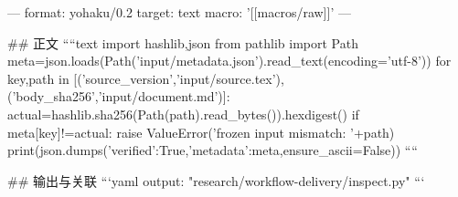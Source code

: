 ---
format: yohaku/0.2
target: text
macro: '[[macros/raw]]'
---

## 正文
````text
import hashlib,json
from pathlib import Path
meta=json.loads(Path('input/metadata.json').read_text(encoding='utf-8'))
for key,path in [('source_version','input/source.tex'),('body_sha256','input/document.md')]:
    actual=hashlib.sha256(Path(path).read_bytes()).hexdigest()
    if meta[key]!=actual: raise ValueError('frozen input mismatch: '+path)
print(json.dumps({'verified':True,'metadata':meta},ensure_ascii=False))
````

## 输出与关联
```yaml
output: "research/workflow-delivery/inspect.py"
```
